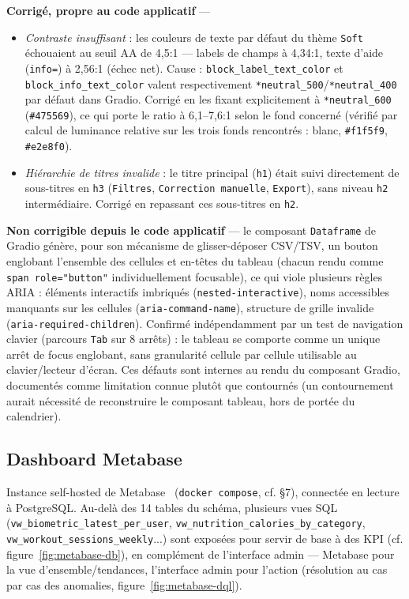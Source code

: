 \documentclass{article}
\begin{document}
\textbf{Corrigé, propre au code applicatif} —
\begin{itemize}[leftmargin=1.4em]
  \item \textit{Contraste insuffisant} : les couleurs de texte par défaut du thème \texttt{Soft} échouaient au seuil AA de 4,5:1 — labels de champs à 4,34:1, texte d'aide (\texttt{info=}) à 2,56:1 (échec net). Cause : \texttt{block\_label\_text\_color} et \texttt{block\_info\_text\_color} valent respectivement \texttt{*neutral\_500}/\texttt{*neutral\_400} par défaut dans Gradio. Corrigé en les fixant explicitement à \texttt{*neutral\_600} (\texttt{\#475569}), ce qui porte le ratio à 6,1--7,6:1 selon le fond concerné (vérifié par calcul de luminance relative sur les trois fonds rencontrés : blanc, \texttt{\#f1f5f9}, \texttt{\#e2e8f0}).
  \item \textit{Hiérarchie de titres invalide} : le titre principal (\texttt{h1}) était suivi directement de sous-titres en \texttt{h3} (\texttt{Filtres}, \texttt{Correction manuelle}, \texttt{Export}), sans niveau \texttt{h2} intermédiaire. Corrigé en repassant ces sous-titres en \texttt{h2}.
\end{itemize}

\textbf{Non corrigible depuis le code applicatif} — le composant \texttt{Dataframe} de Gradio génère, pour son mécanisme de glisser-déposer CSV/TSV, un bouton englobant l'ensemble des cellules et en-têtes du tableau (chacun rendu comme \texttt{span role="button"} individuellement focusable), ce qui viole plusieurs règles ARIA : éléments interactifs imbriqués (\texttt{nested-interactive}), noms accessibles manquants sur les cellules (\texttt{aria-command-name}), structure de grille invalide (\texttt{aria-required-children}). Confirmé indépendamment par un test de navigation clavier (parcours \texttt{Tab} sur 8 arrêts) : le tableau se comporte comme un unique arrêt de focus englobant, sans granularité cellule par cellule utilisable au clavier/lecteur d'écran. Ces défauts sont internes au rendu du composant Gradio, documentés comme limitation connue plutôt que contournés (un contournement aurait nécessité de reconstruire le composant tableau, hors de portée du calendrier).

\subsection{Dashboard Metabase}

Instance self-hosted de Metabase~\citep{metabase} (\texttt{docker compose}, cf. \S7), connectée en lecture à PostgreSQL. Au-delà des 14 tables du schéma, plusieurs vues SQL (\texttt{vw\_biometric\_latest\_per\_user}, \texttt{vw\_nutrition\_calories\_by\_category}, \texttt{vw\_workout\_sessions\_weekly}...) sont exposées pour servir de base à des KPI (cf. figure~\ref{fig:metabase-db}), en complément de l'interface admin — Metabase pour la vue d'ensemble/tendances, l'interface admin pour l'action (résolution au cas par cas des anomalies, figure~\ref{fig:metabase-dql}).
\end{document}
